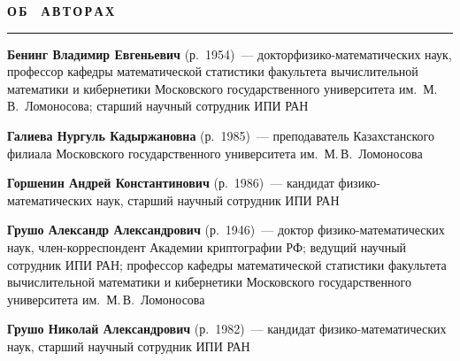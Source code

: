 \def\stat{authorsrus}
{%
\raggedleft\Large \bf%
О\,Б\ \ А\,В\,Т\,О\,Р\,А\,Х \vskip 17pt
    \hrule
    \par
{} }

\label{st\stat}


\def\leftkol{\ } %
\def\rightkol{ОБ АВТОРАХ} %



\vspace*{48pt}

\begin{multicols}{2}





\noindent
\textbf{Бенинг Владимир Евгеньевич} (р.\ 1954)~--- 
доктор\linebreak фи\-зи\-ко-ма\-те\-ма\-ти\-че\-ских наук, профессор кафедры 
математической статистики факультета вычислительной математики и 
кибернетики Московского государственного университета им.\ М.\,В.~Ломоносова; 
старший научный сотрудник ИПИ РАН

\vspace*{8pt}

\noindent
\textbf{Галиева Нургуль Кадыржановна} (р.\ 1985)~--- преподаватель Казахстанского филиала 
Московского государственного университета им.\ М.\,В.~Ломоносова

\vspace*{8pt}

\noindent
\textbf{Горшенин Андрей Константинович} (р.\ 1986)~--- 
кандидат фи\-зи\-ко-математических  наук, старший научный сотрудник  ИПИ РАН

\vspace*{8pt}

\noindent
\textbf{Грушо Александр Александрович} (р.\ 1946)~--- доктор фи\-зи\-ко-ма\-те\-ма\-ти\-че\-ских 
наук, член-кор\-рес\-пон\-дент Академии криптографии РФ; ведущий научный сотрудник ИПИ РАН; 
профессор кафедры математической статистики факультета вычислительной математики и кибернетики 
Московского государственного университета им.\ М.\,В.~Ломоносова 

\vspace*{8pt}

\noindent
\textbf{Грушо Николай Александрович} (р.\ 1982)~--- кандидат фи\-зи\-ко-ма\-те\-ма\-ти\-че\-ских 
наук, старший научный сотрудник ИПИ РАН

\vspace*{8pt}


\end{multicols}
